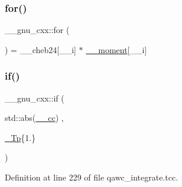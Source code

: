 \subsubsection{\texorpdfstring{for()}{for()}}
{\footnotesize\ttfamily \+\_\+\+\_\+gnu\+\_\+cxx\+::for (\begin{DoxyParamCaption}{ }\end{DoxyParamCaption}) = \+\_\+\+\_\+cheb24\mbox{[}\+\_\+\+\_\+i\mbox{]} $\ast$ \hyperlink{namespace____gnu__cxx_aa353478f1f8d25130d4fc48bf804a24c}{\+\_\+\+\_\+moment}\mbox{[}\+\_\+\+\_\+i\mbox{]}}

\mbox{\label{namespace____gnu__cxx_ad7229840e09434bca7fe1142880bce8b}} 
\subsubsection{\texorpdfstring{if()}{if()}}
{\footnotesize\ttfamily \+\_\+\+\_\+gnu\+\_\+cxx\+::if (\begin{DoxyParamCaption}\item[{std\+::abs(\hyperlink{namespace____gnu__cxx_a7994ff975ddada084e4a738578302940}{\+\_\+\+\_\+cc})}]{,  }\item[{\hyperlink{namespace____gnu__cxx_a3b19a9c800ca194374ef9172290f7d79}{\+\_\+\+Tp}\{1.\+1\}}]{ }\end{DoxyParamCaption})}



Definition at line 229 of file qawc\+\_\+integrate.\+tcc.


